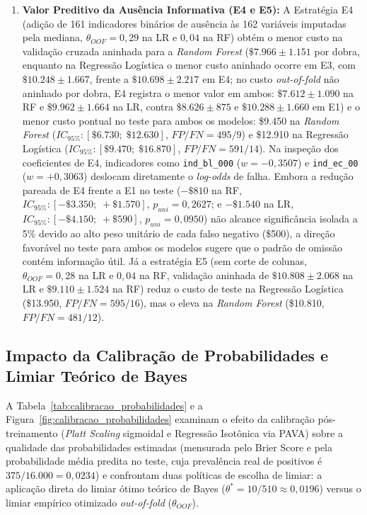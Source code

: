 \documentclass[conference]{IEEEtran}
\begin{document}
\begin{enumerate}
    \item \textbf{Valor Preditivo da Ausência Informativa (E4 e E5):} A Estratégia E4 (adição de 161 indicadores binários de ausência às 162 variáveis imputadas pela mediana, $\theta_{OOF} = 0{,}29$ na LR e $0{,}04$ na RF) obtém o menor custo na validação cruzada aninhada para a \textit{Random Forest} ($\$7.966 \pm 1.151$ por dobra, enquanto na Regressão Logística o menor custo aninhado ocorre em E3, com $\$10.248 \pm 1.667$, frente a $\$10.698 \pm 2.217$ em E4; no custo \textit{out-of-fold} não aninhado por dobra, E4 registra o menor valor em ambos: $\$7.612 \pm 1.090$ na RF e $\$9.962 \pm 1.664$ na LR, contra $\$8.626 \pm 875$ e $\$10.288 \pm 1.660$ em E1) e o menor custo pontual no teste para ambos os modelos: \$9.450 na \textit{Random Forest} ($IC_{95\%}: [\$6.730;\; \$12.630]$, $FP/FN = 495/9$) e \$12.910 na Regressão Logística ($IC_{95\%}: [\$9.470;\; \$16.870]$, $FP/FN = 591/14$). Na inspeção dos coeficientes de E4, indicadores como \texttt{ind\_bl\_000} ($w = -0{,}3507$) e \texttt{ind\_ec\_00} ($w = +0{,}3063$) deslocam diretamente o \textit{log-odds} de falha. Embora a redução pareada de E4 frente a E1 no teste ($-\$810$ na RF, $IC_{95\%}: [-\$3.350;\; +\$1.570]$, $p_{uni} = 0{,}2627$; e $-\$1.540$ na LR, $IC_{95\%}: [-\$4.150;\; +\$590]$, $p_{uni} = 0{,}0950$) não alcance significância isolada a 5\% devido ao alto peso unitário de cada falso negativo (\$500), a direção favorável no teste para ambos os modelos sugere que o padrão de omissão contém informação útil. Já a estratégia E5 (sem corte de colunas, $\theta_{OOF} = 0{,}28$ na LR e $0{,}04$ na RF, validação aninhada de $\$10.808 \pm 2.068$ na LR e $\$9.110 \pm 1.524$ na RF) reduz o custo de teste na Regressão Logística (\$13.950, $FP/FN = 595/16$), mas o eleva na \textit{Random Forest} (\$10.810, $FP/FN = 481/12$).
\end{enumerate}

\subsection{Impacto da Calibração de Probabilidades e Limiar Teórico de Bayes}

A Tabela~\ref{tab:calibracao_probabilidades} e a Figura~\ref{fig:calibracao_probabilidades} examinam o efeito da calibração pós-treinamento (\textit{Platt Scaling} sigmoidal e Regressão Isotônica via PAVA) sobre a qualidade das probabilidades estimadas (mensurada pelo Brier Score e pela probabilidade média predita no teste, cuja prevalência real de positivos é $375/16.000 = 0{,}0234$) e confrontam duas políticas de escolha de limiar: a aplicação direta do limiar ótimo teórico de Bayes ($\theta^* = 10/510 \approx 0{,}0196$) versus o limiar empírico otimizado \textit{out-of-fold} ($\theta_{OOF}$).
\end{document}
